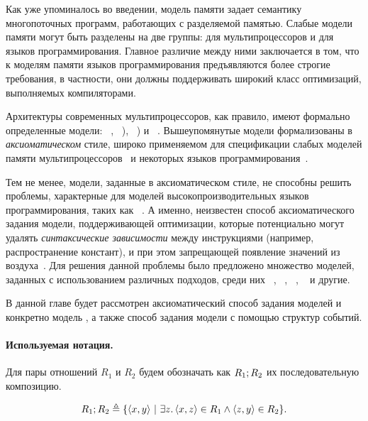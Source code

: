 \pagebreak


Как уже упоминалось во введении, 
модель памяти задает семантику многопоточных программ, 
работающих с разделяемой памятью. 
Слабые модели памяти могут быть разделены на две группы:
для мультипроцессоров и для языков программирования.
Главное различие между ними заключается в том, 
что к моделям памяти языков программирования
предъявляются более строгие требования, 
в частности, они должны поддерживать широкий класс оптимизаций, 
выполняемых компиляторами. 

Архитектуры современных мультипроцессоров, как правило, 
имеют формально определенные модели: \Intel~\cite{Sewell-al:CACM10}, 
\IBMPOWER~\cite{Sarkar-al:PLDI11,Alglave-al:TOPLAS14}),
\ARM~\cite{Pulte-al:POPL18,Alglave-al:TOPLAS14})
и \RISC~\cite{Pulte-al:POPL18}.
Вышеупомянутые модели формализованы в \emph{аксиоматическом} стиле, 
широко применяемом для спецификации 
слабых моделей памяти мультипроцессоров~\cite{Alglave-al:TOPLAS14}
и некоторых языков программирования~\cite{Dolan-al:PLDI18,Watt-al:PLDI2020}.

Тем не менее, модели, заданные в аксиоматическом стиле, 
не способны решить проблемы, характерные 
для моделей высокопроизводительных языков программирования, 
таких как \CPP~\cite{Batty-al:ESOP15}. 
А именно, неизвестен способ аксиоматического задания модели,
поддерживающей оптимизации, которые потенциально могут удалять 
\emph{синтаксические зависимости} между инструкциями 
(например, распространение констант), 
и при этом запрещающей появление значений из воздуха~\cite{Batty-al:ESOP15}. 
Для решения данной проблемы было
предложено множество моделей, заданных с использованием различных подходов, 
среди них \JMM~\cite{Manson-al:POPL05}, \Prm~\cite{Kang-al:POPL17,Lee-al:PLDI20},
\Wkm~\cite{Chakraborty-Vafeiadis:POPL19}, \MRD~\cite{Paviotti-al:ESOP20} и другие.

В данной главе будет рассмотрен аксиоматический способ задания моделей
и конкретно модель \IMM, а также способ задания модели \Wkm
с помощью структур событий.

\paragraph{Используемая нотация.}

Для пары отношений $R_1$ и $R_2$ будем обозначать
как $R_1 ; R_2$ их последовательную композицию.

$$ R_1 ; R_2 \triangleq \{ \langle x, y \rangle ~|~
     \exists z \ldotp \langle x,z \rangle \in R_1 \wedge \langle z,y \rangle \in R_2 \}. $$

